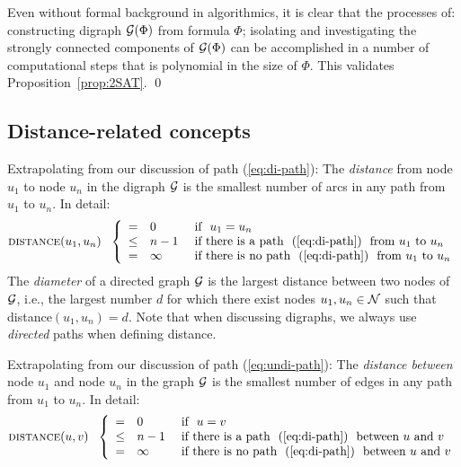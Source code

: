 \medskip

Even without formal background in algorithmics, it is clear that the
processes of: constructing digraph $\mbox{$\cal G$}(\Phi)$ from formula $\Phi$;
isolating and investigating the strongly connected components of
$\mbox{$\cal G$}(\Phi)$ can be accomplished in a number of computational steps that
is polynomial in the size of $\Phi$.  This validates
Proposition~\ref{prop:2SAT}.  \qed



\subsection{Distance-related concepts}

Extrapolating from our discussion of path (\ref{eq:di-path}): The {\it
  distance} from node $u_1$ to node $u_n$ in the digraph $\mbox{$\cal G$}$ is the
smallest number of arcs in any path from $u_1$ to $u_n$.  In detail:
\begin{equation}
\label{eq:di-distance-defn}
 \mbox{\sc distance}(u_1, u_n) \ \ \left\{
\begin{array}{cll}
= & 0 & \mbox{  if  } \ u_1 = u_n \\
\leq & n-1 & \mbox{  if there is a path } \ (\ref{eq:di-path})
\ \mbox{ from $u_1$ to $u_n$} \\
= & \infty & \mbox{  if there is no path } \ (\ref{eq:di-path})
\ \mbox{ from $u_1$ to $u_n$}
\end{array}
\right.
\end{equation}
The {\it diameter} 
 of a directed graph $\mbox{$\cal G$}$ is the largest
distance between two nodes of $\mbox{$\cal G$}$, i.e., the largest number $d$ for
which there exist nodes $u_1, u_n \in \mbox{$\cal N$}$ such that {\sc
  distance}$(u_1, u_n) = d$.  Note that when discussing digraphs, we
always use {\em directed} paths when defining distance.
\medskip

Extrapolating from our discussion of path (\ref{eq:undi-path}): The
{\it distance between} node $u_1$ and node $u_n$ in the graph $\mbox{$\cal G$}$ is
the smallest number of edges in any path from $u_1$ to $u_n$.  In
detail:
\begin{equation}
\label{eq:distance-defn}
 \mbox{\sc distance}(u, v) \ \ \left\{
\begin{array}{cll}
= & 0 & \mbox{  if  } \ u = v \\
\leq & n-1 & \mbox{  if there is a path } \ (\ref{eq:di-path})
\ \mbox{ between $u$ and $v$} \\
= & \infty & \mbox{  if there is no path } \ (\ref{eq:di-path})
\ \mbox{ between $u$ and $v$}
\end{array}
\right.
\end{equation}

